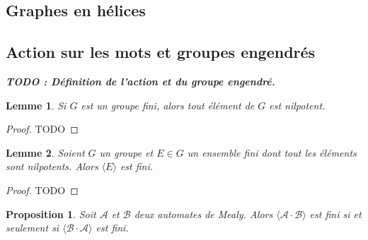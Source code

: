 \documentclass{article}
\newtheorem{prop}{Proposition}
\newtheorem{lemma}{Lemme}
\begin{document}
\subsection{Graphes en hélices}

\newpage

\subsection{Action sur les mots et groupes engendrés}

\textit{\textbf{TODO : Définition de l'action et du groupe engendré.}}

\begin{lemma} \label{lemme_fini_nilpotent}
	Si $G$ est un groupe fini, alors tout élément de $G$ est nilpotent.
\end{lemma}

\begin{proof}
	TODO
\end{proof}

\begin{lemma} \label{lemme_générateur_nilpotent}
	Soient $G$ un groupe et $E \in G$ un ensemble fini dont tout les éléments sont nilpotents. Alors $\langle E \rangle$ est fini.
\end{lemma}

\begin{proof}
	TODO
\end{proof}

\begin{prop}
	Soit $\mathcal{A}$ et $\mathcal{B}$ deux automates de Mealy. Alors $\langle \mathcal{A} \cdot \mathcal{B} \rangle$ est fini si et seulement si $\langle \mathcal{B} \cdot \mathcal{A} \rangle$ est fini.
\end{prop}
\end{document}
